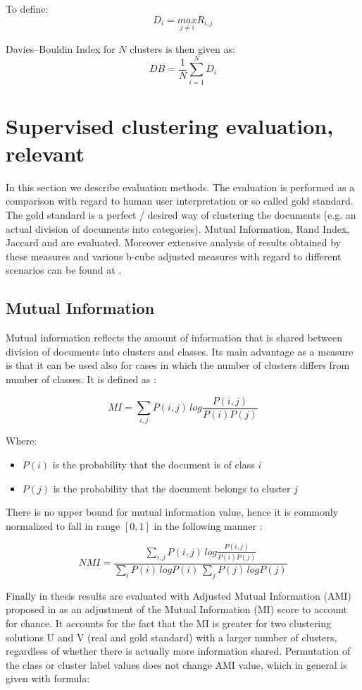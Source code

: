 \documentclass[a4paper, 12pt, oneside]{Thesis} %
\begin{document}
To define:
$$ D_i = \underset{j \neq i}{max} R_{i,j} $$

Davies–Bouldin Index for $N$ clusters is then given as:
$$ DB = \frac{1}{N} \sum_{i=1}^{N} D_i $$

\section{Supervised clustering evaluation, relevant} In this section we describe evaluation methods. The evaluation is performed as a comparison with regard to human user interpretation or so called gold standard. The gold standard is a perfect / desired way of clustering the documents (e.g. an actual division of documents into categories). Mutual Information, Rand Index, Jaccard and  are evaluated. Moreover extensive analysis of results obtained by these measures and various b-cube adjusted measures with regard to different scenarios can be found at \cite{moreno2015adapted}.

\subsection{Mutual Information}\label{section:MutualInformation} Mutual information reflects the amount of information that is shared between division of documents into clusters and classes. Its main advantage as a measure is that it can be used also for cases in which the number of clusters differs from number of classes. It is defined as \cite{andrews2007recent}:

$$ MI = \sum_{i,j} P(i,j)\, log \frac{P(i,j)}{P(i) P(j)} $$

Where:
\begin{itemize}
 \item $P(i)$ is the probability that the document is of class $i$
 \item $P(j)$ is the probability that the document belongs to cluster $j$ 
\end{itemize}

There is no upper bound for mutual information value, hence it is commonly normalized to fall in range $[0, 1]$ in the following manner \cite{strehl2002cluster}:

$$ NMI = \frac{\sum_{i,j} P(i,j)\, log \frac{P(i,j)}{P(i) P(j)}}{\sum_i P(i)\, log P(i)\, \sum_j P(j)\, log P(j)} $$

Finally in thesis results are evaluated with Adjusted Mutual Information (AMI) proposed in \cite{vinh2010information} as an adjustment of the Mutual Information (MI) score to account for chance. It accounts for the fact that the MI is greater for two clustering solutions U and V (real and gold standard) with a larger number of clusters, regardless of whether there is actually more information shared. Permutation of the class or cluster label values does not change AMI value, which in general is given with formula:
\end{document}
